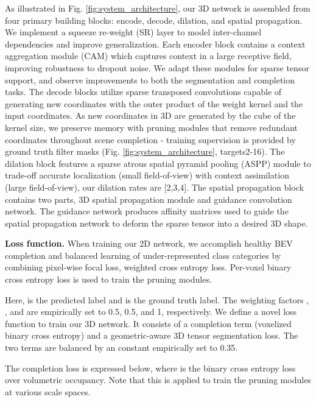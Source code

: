 \documentclass{article}
\begin{document}
As illustrated in Fig. \ref{fig:system_architecture}, our 3D network is assembled from four primary building blocks: encode, decode, dilation, and spatial propagation. We implement a squeeze re-weight (SR) \cite{wang2018pointseg} layer to model inter-channel dependencies and improve generalization. Each encoder block contains a context aggregation module (CAM) \cite{wu2019squeezesegv2} which captures context in a large receptive field, improving robustness to dropout noise. We adapt these modules for sparse tensor support, and observe improvements to both the segmentation and completion tasks. The decode blocks utilize sparse transposed convolutions capable of generating new coordinates with the outer product of the weight kernel and the input coordinates. As new coordinates in 3D are generated by the cube of the kernel size, we preserve memory with pruning modules that remove redundant coordinates throughout scene completion - training supervision is provided by ground truth filter masks (Fig. \ref{fig:system_architecture}, targets2-16). The dilation block features a sparse atrous spatial pyramid pooling (ASPP) module to trade-off accurate localization (small field-of-view) with context assimilation (large field-of-view), our dilation rates are [2,3,4]. The spatial propagation block contains two parts, 3D spatial propagation module and guidance convolution network. The guidance network produces affinity matrices used to guide the spatial propagation network to deform the sparse tensor into a desired 3D shape.








\textbf{Loss function.} When training our 2D network, we accomplish healthy BEV completion and balanced learning of under-represented class categories by combining pixel-wise focal loss, weighted cross entropy loss. Per-voxel binary cross entropy loss is used to train the pruning modules.



Here,  is the predicted label and  is the ground truth label. The weighting factors , , and  are empirically set to 0.5, 0.5, and 1, respectively. We define a novel loss function to train our 3D network. It consists of a completion term (voxelized binary cross entropy) and a geometric-aware 3D tensor segmentation loss. The two terms are balanced by an  constant empirically set to 0.35.



The completion loss is expressed below, where  is the binary cross entropy loss over volumetric occupancy. Note that this is applied to train the pruning modules at various scale spaces.
\end{document}

